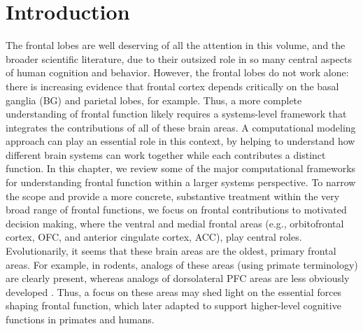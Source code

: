 \documentclass[11pt,twoside]{article}
\newif\myifpdf
\begin{document}


\titlesamepageoc{\mytitle}{\myauthor}{\mynote}{\myabstract}



\pagestyle{myheadings}

\section{Introduction}

The frontal lobes are well deserving of all the attention in this volume, and the broader scientific literature, due to their outsized role in so many central aspects of human cognition and behavior.  However, the frontal lobes do not work alone: there is increasing evidence that frontal cortex depends critically on the basal ganglia (BG) and parietal lobes, for example.  Thus, a more complete understanding of frontal function likely requires a systems-level framework that integrates the contributions of all of these brain areas.  A computational modeling approach can play an essential role in this context, by helping to understand how different brain systems can work together while each contributes a distinct function.  In this chapter, we review some of the major computational frameworks for understanding frontal function within a larger systems perspective.  To narrow the scope and provide a more concrete, substantive treatment within the very broad range of frontal functions, we focus on frontal contributions to motivated decision making, where the ventral and medial frontal areas (e.g., orbitofrontal cortex, OFC, and anterior cingulate cortex, ACC), play central roles.  Evolutionarily, it seems that these brain areas are the oldest, primary frontal areas.  For example, in rodents, analogs of these areas (using primate terminology) are clearly present, whereas analogs of dorsolateral PFC areas are less obviously developed \cite[e.g.,]{BrownBowman02,UylingsGroenewegenKolb03,OngurPrice00}.  Thus, a focus on these areas may shed light on the essential forces shaping frontal function, which later adapted to support higher-level cognitive functions in primates and humans.
\end{document}
